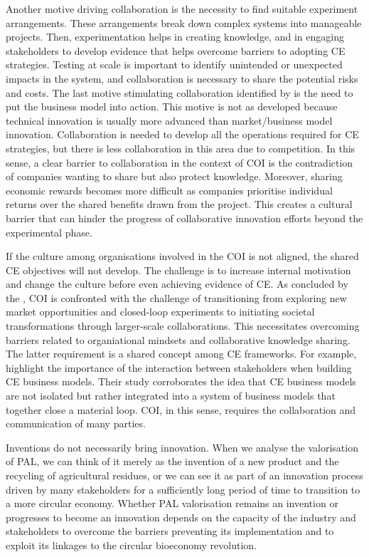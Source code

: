 Another motive driving collaboration is the necessity to find suitable experiment arrangements. These arrangements break down complex systems into manageable projects. Then, experimentation helps in creating knowledge, and in engaging stakeholders to develop evidence that helps overcome barriers to adopting CE strategies. Testing at scale is important to identify unintended or unexpected impacts in the system, and collaboration is necessary to share the potential risks and costs. The last motive stimulating collaboration identified by \citeauthor{brown2019companies} is the need to put the business model into action. This motive is not as developed because technical innovation is usually more advanced than market/business model innovation. Collaboration is needed to develop all the operations required for CE strategies, but there is less collaboration in this area due to competition. In this sense, a clear barrier to collaboration in the context of COI is the contradiction of companies wanting to share but also protect knowledge. Moreover, sharing economic rewards becomes more difficult as companies prioritise individual returns over the shared benefits drawn from the project. This creates a cultural barrier that can hinder the progress of collaborative innovation efforts beyond the experimental phase. 

If the culture among organisations involved in the COI is not aligned, the shared CE objectives will not develop. The challenge is to increase internal motivation and change the culture before even achieving evidence of CE. As concluded by the \citeauthor{brown2019companies}, COI is confronted with the challenge of transitioning from exploring new market opportunities and closed-loop experiments to initiating societal transformations through larger-scale collaborations. This necessitates overcoming barriers related to organiational mindsets and collaborative knowledge sharing. The latter requirement is a shared concept among CE frameworks. For example, \cite{antikainen2016framework} highlight the importance of the interaction between stakeholders when building CE business models. Their study corroborates the idea that CE business models are not isolated but rather integrated into a system of business models that together close a material loop. COI, in this sense, requires the collaboration and communication of many parties.

Inventions do not necessarily bring innovation. When we analyse the valorisation of PAL, we can think of it merely as the invention of a new product and the recycling of agricultural residues, or we can see it as part of an innovation process driven by many stakeholders for a sufficiently long period of time to transition to a more circular economy. Whether PAL valorisation remains an invention or progresses to become an innovation depends on the capacity of the industry and stakeholders to overcome the barriers preventing its implementation and to exploit its linkages to the circular bioeconomy revolution.

